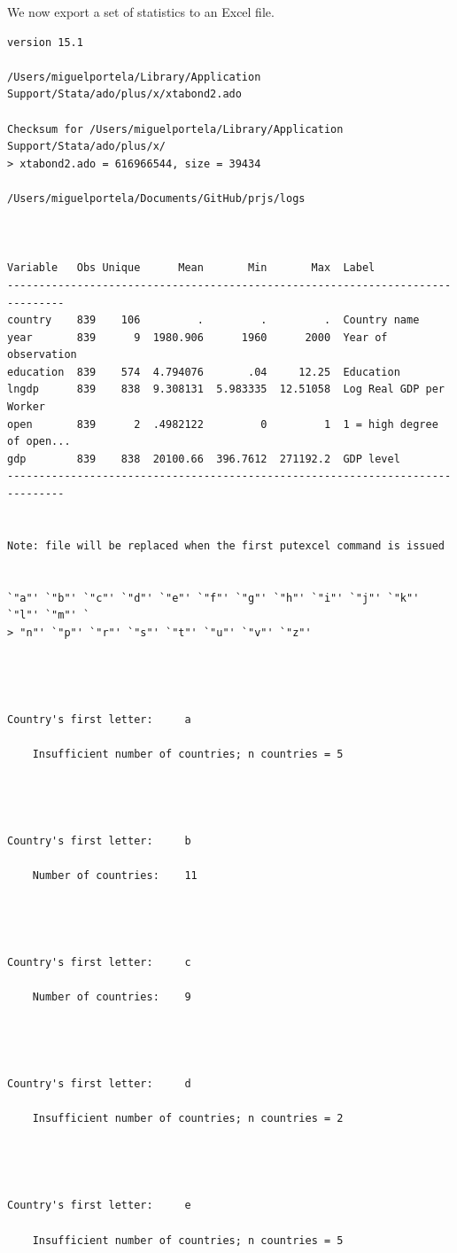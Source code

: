 \documentclass[
  12pt,
]{article}
\begin{document}
We now export a set of statistics to an Excel file.

\begin{verbatim}
version 15.1

/Users/miguelportela/Library/Application Support/Stata/ado/plus/x/xtabond2.ado

Checksum for /Users/miguelportela/Library/Application Support/Stata/ado/plus/x/
> xtabond2.ado = 616966544, size = 39434

/Users/miguelportela/Documents/GitHub/prjs/logs



Variable   Obs Unique      Mean       Min       Max  Label
-------------------------------------------------------------------------------
country    839    106         .         .         .  Country name
year       839      9  1980.906      1960      2000  Year of observation
education  839    574  4.794076       .04     12.25  Education
lngdp      839    838  9.308131  5.983335  12.51058  Log Real GDP per Worker
open       839      2  .4982122         0         1  1 = high degree of open...
gdp        839    838  20100.66  396.7612  271192.2  GDP level
-------------------------------------------------------------------------------


Note: file will be replaced when the first putexcel command is issued


`"a"' `"b"' `"c"' `"d"' `"e"' `"f"' `"g"' `"h"' `"i"' `"j"' `"k"' `"l"' `"m"' `
> "n"' `"p"' `"r"' `"s"' `"t"' `"u"' `"v"' `"z"'




Country's first letter:     a

    Insufficient number of countries; n countries = 5




Country's first letter:     b

    Number of countries:    11




Country's first letter:     c

    Number of countries:    9




Country's first letter:     d

    Insufficient number of countries; n countries = 2




Country's first letter:     e

    Insufficient number of countries; n countries = 5





\end{verbatim}
\end{document}
